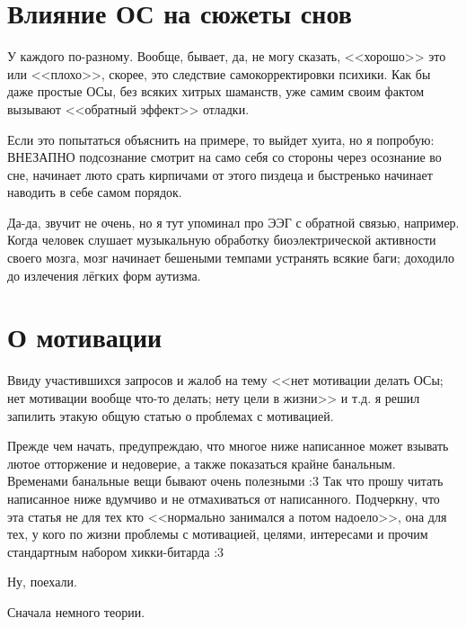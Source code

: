 \documentclass[a4paper,14pt,oneside]{memoir}
\begin{document}
\section{Влияние ОС на сюжеты снов}

\medskip
У каждого по-разному. Вообще, бывает, да, не могу сказать, <<хорошо>> это или <<плохо>>, скорее, это следствие самокорректировки психики. Как бы даже простые ОСы, без всяких хитрых шаманств, уже самим своим фактом вызывают <<обратный эффект>> отладки. 

Если это попытаться объяснить на примере, то выйдет хуита, но я попробую: ВНЕЗАПНО подсознание смотрит на само себя со стороны через осознание во сне, начинает люто срать кирпичами от этого пиздеца и быстренько начинает наводить в себе самом порядок. 

Да-да, звучит не очень, но я тут упоминал про ЭЭГ с обратной связью, например. Когда человек слушает музыкальную обработку биоэлектрической активности своего мозга, мозг начинает бешеными темпами устранять всякие баги; доходило до излечения лёгких форм аутизма.




\section{О мотивации}

Ввиду участившихся запросов и жалоб на тему <<нет мотивации делать ОСы; нет мотивации вообще что-то делать; нету цели в жизни>> и т.д. я решил запилить этакую общую статью о проблемах с мотивацией.

Прежде чем начать, предупреждаю, что многое ниже написанное может взывать лютое отторжение и недоверие, а также показаться крайне банальным. Временами банальные вещи бывают очень полезными :3 Так что прошу читать написанное ниже вдумчиво и не отмахиваться от написанного. Подчеркну, что эта статья не для тех кто <<нормально занимался а потом надоело>>, она для тех, у кого по жизни проблемы с мотивацией, целями, интересами и прочим стандартным набором хикки-битарда :3

Ну, поехали.

Сначала немного теории.
\end{document}
